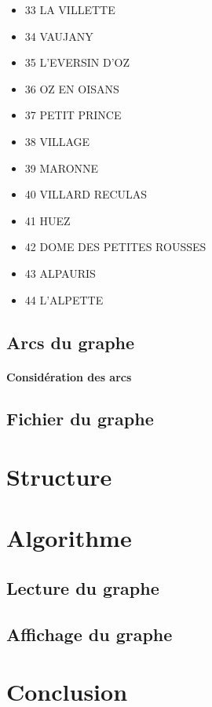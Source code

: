 \documentclass[a4]{article}
\begin{document}
\begin{itemize}
			\item 33 LA VILLETTE
			\item 34 VAUJANY
			\item 35 L'EVERSIN D'OZ
			\item 36 OZ EN OISANS
			\item 37 PETIT PRINCE
			\item 38 VILLAGE
			\item 39 MARONNE
			\item 40 VILLARD RECULAS
			\item 41 HUEZ
			\item 42 DOME DES PETITES ROUSSES
			\item 43 ALPAURIS
			\item 44 L'ALPETTE
			\end{itemize}
		\subsection{Arcs du graphe}
			\paragraph{Considération des arcs\\}
		\subsection{Fichier du graphe}
	\section{Structure}
	\section{Algorithme}
		
		\subsection{Lecture du graphe}
		\subsection{Affichage du graphe}
	\section{Conclusion}
\end{document}
